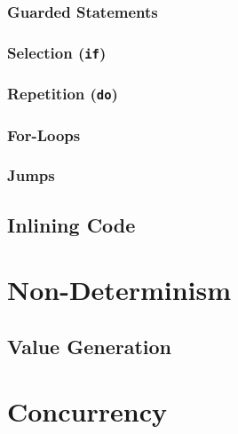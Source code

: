 \documentclass[a4paper, 11pt, accentcolor = tud3b]{tudreport}
\begin{document}
                \subsubsection{Guarded Statements} %

                \subsubsection{Selection (\texttt{if})} %

                \subsubsection{Repetition (\texttt{do})} %

                \subsubsection{For-Loops} %

                \subsubsection{Jumps} %

            \subsection{Inlining Code} %

        \section{Non-Determinism} %

            \subsection{Value Generation} %

        \section{Concurrency} %
\end{document}

